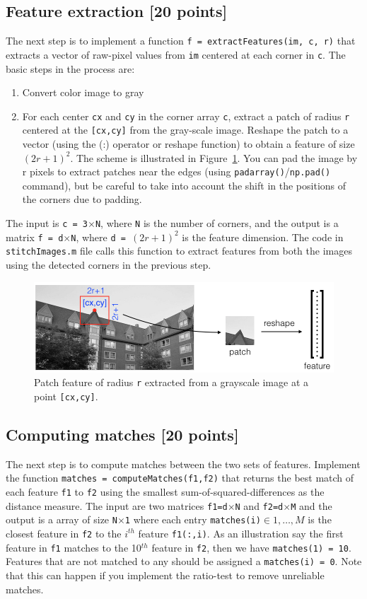 \documentclass[10pt,letterpaper]{article}
\newcommand{\cmd}[1] {{\color{blue}\texttt{#1}}}
\begin{document}
\subsection{Feature extraction [20 points]}
The next step is to implement a function \cmd{f = extractFeatures(im, c, r)} that extracts a vector of raw-pixel values from \cmd{im} centered at each corner in \cmd{c}. The basic steps in the process are:
\begin{enumerate}
\item Convert color image to gray
\item For each center \cmd{cx} and \cmd{cy} in the corner array \cmd{c}, extract a patch of radius \cmd{r} centered at the \cmd{[cx,cy]} from the gray-scale image. Reshape the patch to a vector (using the (:) operator or reshape function) to obtain a feature of size $(2r+1)^2$. The scheme is illustrated in Figure~\ref{fig:feat}. 
You can pad the image by r pixels to extract patches near the edges (using \cmd{padarray()}/\cmd{np.pad()} command), but be careful to take into account the shift in the positions of the corners due to padding.
\end{enumerate}

The input is \cmd{c = 3$\times$N}, where \cmd{N} is the number of corners, and the output is a matrix \cmd{f = d$\times$N}, where \cmd{d = $(2r+1)^2$} is the feature dimension. The code in \cmd{stitchImages.m} file calls this function to extract features from both the images using the detected corners in the previous step.

\begin{figure}[h]
\centering
\includegraphics[width=0.9\linewidth]{patchFeatures.png}
\caption{\label{fig:feat} Patch feature of radius \cmd{r} extracted from a grayscale image at a point \cmd{[cx,cy]}.}
\end{figure}

\subsection{Computing matches [20 points]}
The next step is to compute matches between the two sets of features. 
Implement the function \cmd{matches = computeMatches(f1,f2)} that returns the best match of each feature \cmd{f1} to \cmd{f2} using the smallest sum-of-squared-differences as the distance measure. 
The input are two matrices \cmd{f1=d$\times$N} and \cmd{f2=d$\times$M} and the output is a array of size \cmd{N$\times$1} where each entry \cmd{matches(i)$\in {1, \ldots, M}$} is the closest feature in \cmd{f2} to the $i^{th}$ feature \cmd{f1(:,i)}.
As an illustration say the first feature in \cmd{f1} matches to the 10$^{th}$ feature in \cmd{f2}, then we have \cmd{matches(1) = 10}. Features that are not matched to any should be assigned a \cmd{matches(i) = 0}. Note that this can happen if you implement the ratio-test to remove unreliable matches.
\end{document}
